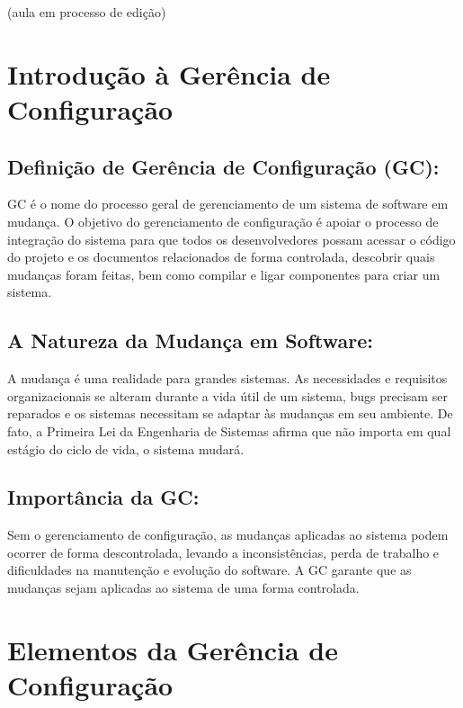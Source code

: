 \documentclass[
]{book}
\begin{document}
(aula em processo de edição)

\section{Introdução à Gerência de Configuração}\label{introduuxe7uxe3o-uxe0-geruxeancia-de-configurauxe7uxe3o}

\subsection{Definição de Gerência de Configuração (GC):}\label{definiuxe7uxe3o-de-geruxeancia-de-configurauxe7uxe3o-gc}

GC é o nome do processo geral de gerenciamento de um sistema de software em mudança. O objetivo do gerenciamento de configuração é apoiar o processo de integração do sistema para que todos os desenvolvedores possam acessar o código do projeto e os documentos relacionados de forma controlada, descobrir quais mudanças foram feitas, bem como compilar e ligar componentes para criar um sistema.

\subsection{A Natureza da Mudança em Software:}\label{a-natureza-da-mudanuxe7a-em-software}

A mudança é uma realidade para grandes sistemas. As necessidades e requisitos organizacionais se alteram durante a vida útil de um sistema, bugs precisam ser reparados e os sistemas necessitam se adaptar às mudanças em seu ambiente. De fato, a Primeira Lei da Engenharia de Sistemas afirma que não importa em qual estágio do ciclo de vida, o sistema mudará.

\subsection{Importância da GC:}\label{importuxe2ncia-da-gc}

Sem o gerenciamento de configuração, as mudanças aplicadas ao sistema podem ocorrer de forma descontrolada, levando a inconsistências, perda de trabalho e dificuldades na manutenção e evolução do software. A GC garante que as mudanças sejam aplicadas ao sistema de uma forma controlada.

\section{Elementos da Gerência de Configuração}\label{elementos-da-geruxeancia-de-configurauxe7uxe3o}
\end{document}
